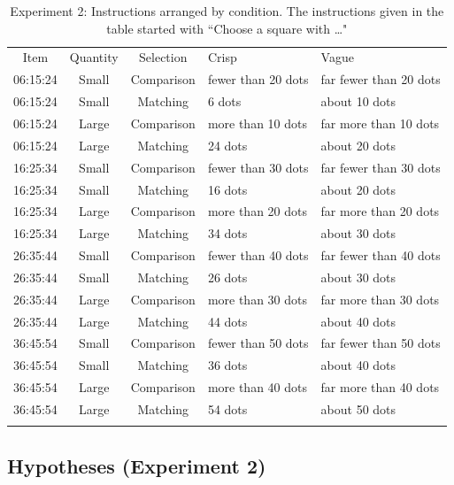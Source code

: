 \begin{table}
\centering
\caption{Experiment 2: Instructions arranged by condition. The instructions given in the table started with ``Choose a square with \ldots"} 
\label{Instructions for e2}
\begin{tabular}{cccll}
\hline\noalign{\smallskip}
Item & Quantity & Selection & Crisp & Vague \\ 
\noalign{\smallskip}\hline\noalign{\smallskip}
06:15:24 & Small & Comparison & fewer than 20 dots & far fewer than 20 dots \\ 
06:15:24 & Small & Matching & 6 dots & about 10 dots \\ 
06:15:24 & Large & Comparison & more than 10 dots & far more than 10 dots \\ 
06:15:24 & Large & Matching & 24 dots & about 20 dots \\ 
\noalign{\smallskip}\hline\noalign{\smallskip}
16:25:34 & Small & Comparison & fewer than 30 dots & far fewer than 30 dots \\ 
16:25:34 & Small & Matching & 16 dots & about 20 dots \\ 
16:25:34 & Large & Comparison & more than 20 dots & far more than 20 dots \\ 
16:25:34 & Large & Matching & 34 dots & about 30 dots \\ 
\noalign{\smallskip}\hline\noalign{\smallskip}
26:35:44 & Small & Comparison & fewer than 40 dots & far fewer than 40 dots \\ 
26:35:44 & Small & Matching & 26 dots & about 30 dots \\ 
26:35:44 & Large & Comparison & more than 30 dots & far more than 30 dots \\ 
26:35:44 & Large & Matching & 44 dots & about 40 dots \\ 
\noalign{\smallskip}\hline\noalign{\smallskip}
36:45:54 & Small & Comparison & fewer than 50 dots & far fewer than 50 dots \\ 
36:45:54 & Small & Matching & 36 dots & about 40 dots \\ 
36:45:54 & Large & Comparison & more than 40 dots & far more than 40 dots \\ 
36:45:54 & Large & Matching & 54 dots & about 50 dots \\ 
\noalign{\smallskip}\hline
\end{tabular}
\end{table}

\subsection{Hypotheses (Experiment 2)}

